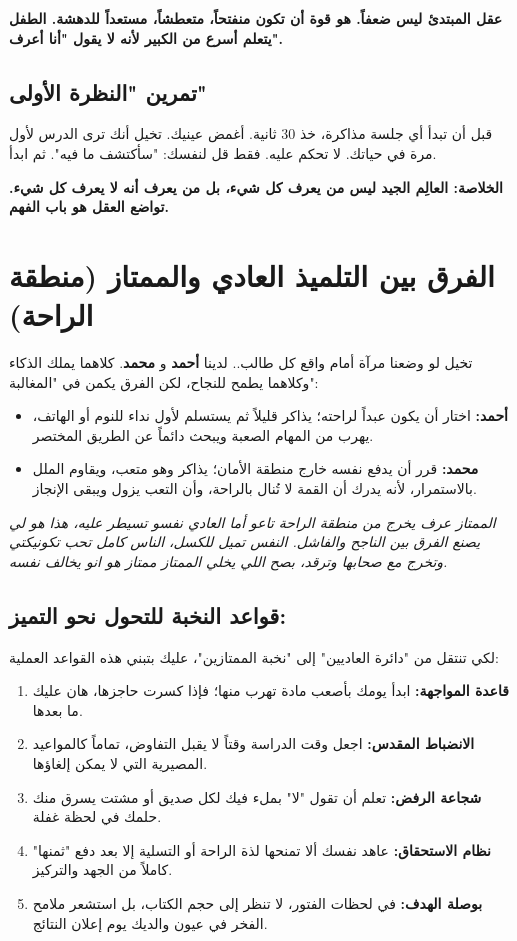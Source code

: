 \documentclass[12pt,a4paper]{book}
\newcommand{\quoteAr}[1]{%
	\begin{myquote}
		\itshape #1
	\end{myquote}
}
\newcommand{\importantAr}[1]{%
	\begin{important}
		\bfseries #1
	\end{important}
}
\begin{document}
	\importantAr{عقل المبتدئ ليس ضعفاً. هو قوة أن تكون منفتحاً، متعطشاً، مستعداً للدهشة. الطفل يتعلم أسرع من الكبير لأنه لا يقول "أنا أعرف".}
	
	\subsection{تمرين "النظرة الأولى"}
	
	قبل أن تبدأ أي جلسة مذاكرة، خذ 30 ثانية. أغمض عينيك. تخيل أنك ترى الدرس لأول مرة في حياتك. لا تحكم عليه. فقط قل لنفسك: "سأكتشف ما فيه". ثم ابدأ.
	
	\importantAr{الخلاصة: العالِم الجيد ليس من يعرف كل شيء، بل من يعرف أنه لا يعرف كل شيء. تواضع العقل هو باب الفهم.}
	
	\section{الفرق بين التلميذ العادي والممتاز (منطقة الراحة)}
	\label{sec:owner-experiences}
	
	
	تخيل لو وضعنا مرآة أمام واقع كل طالب.. لدينا \textbf{أحمد} و\textbf{ محمد}. كلاهما يملك الذكاء وكلاهما يطمح للنجاح، لكن الفرق يكمن في "المغالبة":
	
	\begin{itemize}
		\item \textbf{أحمد:} اختار أن يكون عبداً لراحته؛ يذاكر قليلاً ثم يستسلم لأول نداء للنوم أو الهاتف، يهرب من المهام الصعبة ويبحث دائماً عن الطريق المختصر.
		\item \textbf{محمد:} قرر أن يدفع نفسه خارج منطقة الأمان؛ يذاكر وهو متعب، ويقاوم الملل بالاستمرار، لأنه يدرك أن القمة لا تُنال بالراحة، وأن التعب يزول ويبقى الإنجاز.
	\end{itemize}

		\quoteAr{الممتاز عرف يخرج من منطقة الراحة تاعو أما العادي نفسو تسيطر عليه، هذا هو لي يصنع الفرق بين الناجح والفاشل. النفس تميل للكسل، الناس كامل تحب تكونيكتي وتخرج مع صحابها وترقد، بصح اللي يخلي الممتاز ممتاز هو انو يخالف نفسه.}


	\subsection*{قواعد النخبة للتحول نحو التميز:}
	لكي تنتقل من "دائرة العاديين" إلى "نخبة الممتازين"، عليك بتبني هذه القواعد العملية:
	
	\begin{enumerate}
		\item \textbf{قاعدة المواجهة:} ابدأ يومك بأصعب مادة تهرب منها؛ فإذا كسرت حاجزها، هان عليك ما بعدها.
		\item \textbf{الانضباط المقدس:} اجعل وقت الدراسة وقتاً لا يقبل التفاوض، تماماً كالمواعيد المصيرية التي لا يمكن إلغاؤها.
		\item \textbf{شجاعة الرفض:} تعلم أن تقول "لا" بملء فيك لكل صديق أو مشتت يسرق منك حلمك في لحظة غفلة.
		\item \textbf{نظام الاستحقاق:} عاهد نفسك ألا تمنحها لذة الراحة أو التسلية إلا بعد دفع "ثمنها" كاملاً من الجهد والتركيز.
		\item \textbf{بوصلة الهدف:} في لحظات الفتور، لا تنظر إلى حجم الكتاب، بل استشعر ملامح الفخر في عيون والديك يوم إعلان النتائج.
	\end{enumerate}
	
\end{document}
